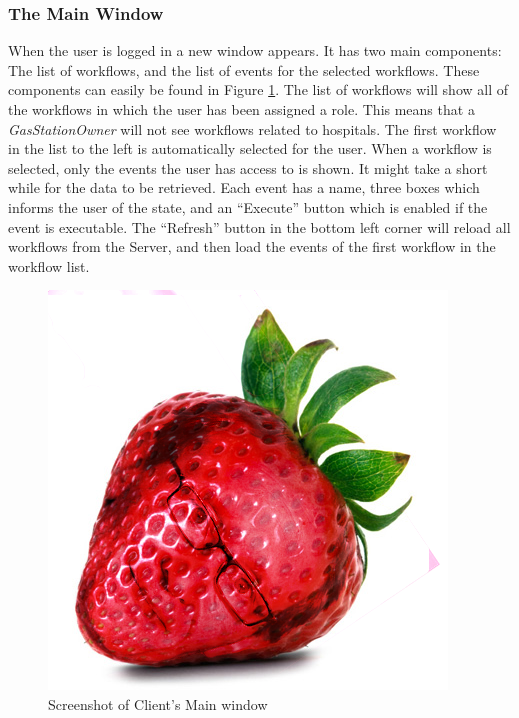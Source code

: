 \subsubsection{The Main Window}
When the user is logged in a new window appears. It has two main components: The list of workflows, and the list of events for the selected workflows. These components can easily be found in Figure \ref{fig:MainWindowClient}. The list of workflows will show all of the workflows in which the user has been assigned a role. This means that a \textit{GasStationOwner} will not see workflows related to hospitals. The first workflow in the list to the left is automatically selected for the user. \newline
When a workflow is selected, only the events the user has access to is shown. It might take a short while for the data to be retrieved. Each event has a name, three boxes which informs the user of the state, and an “Execute” button which is enabled if the event is executable. \newline
The “Refresh” button in the bottom left corner will reload all workflows from the Server, and then load the events of the first workflow in the workflow list.

\begin{figure}
\centering
\includegraphics[width=0.4\linewidth]{Figures/strawberry}
\caption{\label{fig:MainWindowClient} Screenshot of Client's Main window}
\end{figure}


